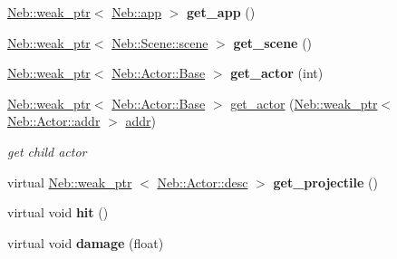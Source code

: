 \begin{DoxyCompactItemize}
\item 
\hypertarget{classNeb_1_1Actor_1_1Base_ac94aa8055519ab639c12855d307afc03}{\hyperlink{classNeb_1_1weak__ptr}{\-Neb\-::weak\-\_\-ptr}$<$ \hyperlink{classNeb_1_1app}{\-Neb\-::app} $>$ {\bfseries get\-\_\-app} ()}\label{classNeb_1_1Actor_1_1Base_ac94aa8055519ab639c12855d307afc03}

\item 
\hypertarget{classNeb_1_1Actor_1_1Base_a9e3d8026a3268f70f9d87d0545f11544}{\hyperlink{classNeb_1_1weak__ptr}{\-Neb\-::weak\-\_\-ptr}$<$ \hyperlink{classNeb_1_1Scene_1_1scene}{\-Neb\-::\-Scene\-::scene} $>$ {\bfseries get\-\_\-scene} ()}\label{classNeb_1_1Actor_1_1Base_a9e3d8026a3268f70f9d87d0545f11544}

\item 
\hypertarget{classNeb_1_1Actor_1_1Base_a21c486c0e2c29ed1c4c2a9d581c022ea}{\hyperlink{classNeb_1_1weak__ptr}{\-Neb\-::weak\-\_\-ptr}$<$ \hyperlink{classNeb_1_1Actor_1_1Base}{\-Neb\-::\-Actor\-::\-Base} $>$ {\bfseries get\-\_\-actor} (int)}\label{classNeb_1_1Actor_1_1Base_a21c486c0e2c29ed1c4c2a9d581c022ea}

\item 
\hyperlink{classNeb_1_1weak__ptr}{\-Neb\-::weak\-\_\-ptr}$<$ \hyperlink{classNeb_1_1Actor_1_1Base}{\-Neb\-::\-Actor\-::\-Base} $>$ \hyperlink{classNeb_1_1Actor_1_1Base_ad5acc8ec9b76f0d49050bf6b50823508}{get\-\_\-actor} (\hyperlink{classNeb_1_1weak__ptr}{\-Neb\-::weak\-\_\-ptr}$<$ \hyperlink{classNeb_1_1Actor_1_1addr}{\-Neb\-::\-Actor\-::addr} $>$ \hyperlink{classNeb_1_1Actor_1_1addr}{addr})
\begin{DoxyCompactList}\small\item\em get child actor \end{DoxyCompactList}\item 
\hypertarget{classNeb_1_1Actor_1_1Base_a5aa9fd406bdf6363b6a8db3dd07a733c}{virtual \hyperlink{classNeb_1_1weak__ptr}{\-Neb\-::weak\-\_\-ptr}\*
$<$ \hyperlink{classNeb_1_1Actor_1_1desc}{\-Neb\-::\-Actor\-::desc} $>$ {\bfseries get\-\_\-projectile} ()}\label{classNeb_1_1Actor_1_1Base_a5aa9fd406bdf6363b6a8db3dd07a733c}

\item 
\hypertarget{classNeb_1_1Actor_1_1Base_afc072654755bb4db2e1af77a55e7f8dd}{virtual void {\bfseries hit} ()}\label{classNeb_1_1Actor_1_1Base_afc072654755bb4db2e1af77a55e7f8dd}

\item 
\hypertarget{classNeb_1_1Actor_1_1Base_aa8065352d9f093036db30ea7a4e04828}{virtual void {\bfseries damage} (float)}\label{classNeb_1_1Actor_1_1Base_aa8065352d9f093036db30ea7a4e04828}


\end{DoxyCompactItemize}
